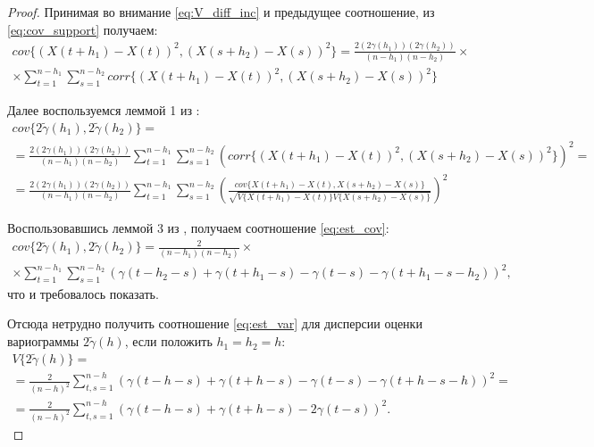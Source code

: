 \begin{proof}
Принимая во внимание \eqref{eq:V_diff_inc} и предыдущее соотношение, из \eqref{eq:cov_support} получаем:
\begin{equation*}\begin{gathered}
	cov\{ (X(t + h_1) - X(t))^2, (X(s + h_2) - X(s))^2 \} = \frac{2 (2\gamma(h_1))(2\gamma(h_2))}{(n - h_1)(n - h_2)} \times \\
	\times \sum_{t = 1}^{n - h_1}\sum_{s = 1}^{n - h_2} corr\{(X(t + h_1) - X(t))^2, (X(s + h_2) - X(s))^2 \}
\end{gathered}\end{equation*}

Далее воспользуемся леммой 1 из \cite{tsekhavaya-brest}:
\begin{equation*}\begin{gathered}
	cov\{ 2 \tilde{\gamma}(h_1), 2 \tilde{\gamma}(h_2) \} = \\
	= \frac{2 (2\gamma(h_1))(2\gamma(h_2))}{(n - h_1)(n - h_2)} \sum_{t = 1}^{n - h_1}\sum_{s = 1}^{n - h_2} (corr\{(X(t + h_1) - X(t))^2, (X(s + h_2) - X(s))^2 \})^2 = \\
	= \frac{2 (2\gamma(h_1))(2\gamma(h_2))}{(n - h_1)(n - h_2)}\sum_{t = 1}^{n - h_1}\sum_{s = 1}^{n - h_2} ( \frac{cov\{ X(t + h_1) - X(t), X(s + h_2) - X(s) \}}{\sqrt{V\{ X( t + h_1) - X(t) \} V\{ X(s + h_2) - X(s) \}}} )^2
\end{gathered}\end{equation*}

Воспользовавшись леммой 3 из \cite{tsekhavaya-brest}, получаем соотношение \eqref{eq:est_cov}:
\begin{gather*}
	cov\{ 2 \tilde{\gamma}(h_1), 2 \tilde{\gamma}(h_2) \} = \frac{2}{(n - h_1)(n - h_2)} \times \\
	\times \sum_{t = 1}^{n - h_1}\sum_{s = 1}^{n - h_2} (\gamma(t - h_2 - s) + \gamma(t + h_1 - s) - \gamma(t - s) - \gamma(t + h_1 - s - h_2))^2,
\end{gather*}
что и требовалось показать.

Отсюда нетрудно получить соотношение \eqref{eq:est_var} для дисперсии оценки вариограммы $ 2 \tilde{\gamma}(h) $, если положить $ h_1 = h_2 = h $:
\begin{equation*}\begin{gathered}
	V \{ 2 \tilde{\gamma}(h) \} = \\
	= \frac{2}{(n - h)^2}\sum_{t,s = 1}^{n - h} ( \gamma(t - h - s) + \gamma(t + h - s) - \gamma(t - s) - \gamma(t + h - s - h) )^2 = \\
	= \frac{2}{(n-h)^2}\sum_{t,s = 1}^{n - h} ( \gamma(t - h - s) + \gamma(t + h - s) - 2\gamma(t - s) )^2.
\end{gathered}\end{equation*}

\end{proof}

